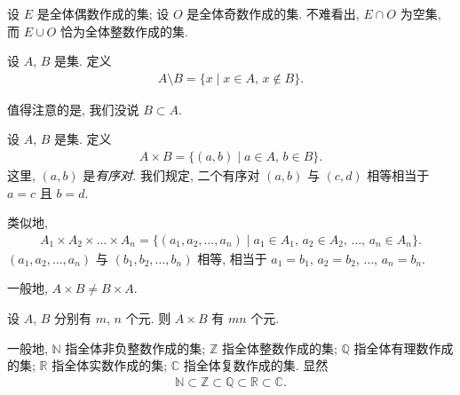 \begin{example}
    设 $E$ 是全体偶数作成的集; 设 $O$ 是全体奇数作成的集. 不难看出, $E \cap O$ 为空集, 而 $E \cup O$ 恰为全体整数作成的集.
\end{example}

\begin{definition}
    设 $A$, $B$ 是集. 定义
    \begin{align*}
        A \setminus B = \{ x \mid \text{$x \in A$, $x \notin B$} \}.
    \end{align*}
\end{definition}

\begin{remark}
    值得注意的是, 我们没说 $B \subset A$.
\end{remark}

\begin{definition}
    设 $A$, $B$ 是集. 定义
    \begin{align*}
        A \times B = \{ (a,b) \mid \text{$a \in A$, $b \in B$} \}.
    \end{align*}
    这里, $(a, b)$ 是\emph{有序对}. 我们规定, 二个有序对 $(a, b)$ 与 $(c, d)$ 相等相当于 $a = c$ 且 $b = d$.

    类似地,
    \begin{align*}
        A_1 \times A_2 \times \dots \times A_n = \{ (a_1, a_2, \dots, a_n) \mid \text{$a_1 \in A_1$, $a_2 \in A_2$, $\dots$, $a_n \in A_n$} \}.
    \end{align*}
    $(a_1, a_2, \dots, a_n)$ 与 $(b_1, b_2, \dots, b_n)$ 相等, 相当于 $a_1 = b_1$, $a_2 = b_2$, $\dots$, $a_n = b_n$.
\end{definition}

\begin{remark}
    一般地, $A \times B \neq B \times A$.
\end{remark}

\begin{remark}
    设 $A$, $B$ 分别有 $m$, $n$ 个元. 则 $A \times B$ 有 $mn$ 个元.
\end{remark}

\begin{definition}
    一般地, $\mathbb{N}$ 指全体非负整数作成的集; $\mathbb{Z}$ 指全体整数作成的集; $\mathbb{Q}$ 指全体有理数作成的集; $\mathbb{R}$ 指全体实数作成的集; $\mathbb{C}$ 指全体复数作成的集. 显然
    \begin{align*}
        \mathbb{N} \subset \mathbb{Z} \subset \mathbb{Q} \subset \mathbb{R} \subset \mathbb{C}.
    \end{align*}
\end{definition}

